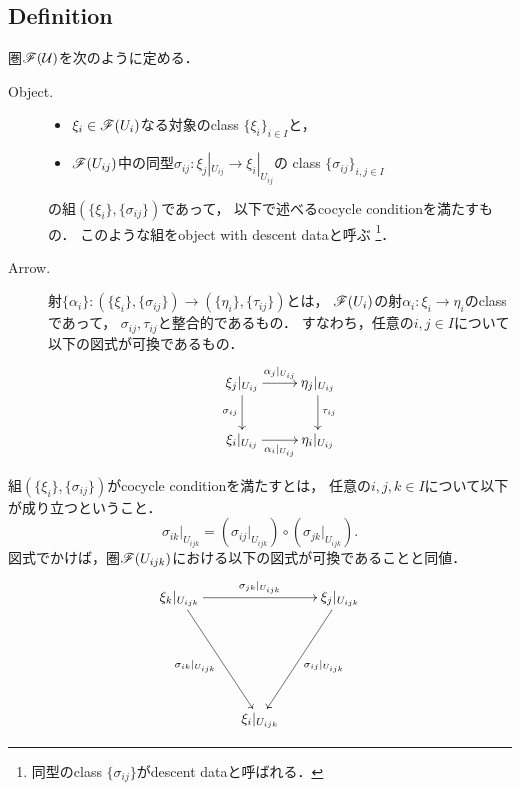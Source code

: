 \documentclass[a4paper]{jsarticle}
\begin{document}
\subsection{Definition}
\begin{Def}
    圏$\mathscr{F}(\mathcal{U})$を次のように定める．
    \begin{description}
        \item[Object.] \hfill \vspace{-0.2cm}
            \begin{itemize}
                \item $\xi_i \in \mathscr{F}(U_i)$なる対象のclass $\{\xi_i\}_{i \in I}$と，
                \item
                    $\mathscr{F}(U_{ij})$中の同型$\sigma_{ij} \colon \xi_j|_{U_{ij}} \to \xi_i|_{U_{ij}}$の
                    class $\{\sigma_{ij}\}_{i,j \in I}$
            \end{itemize}
            の組$(\{\xi_i\}, \{\sigma_{ij}\})$であって，
            以下で述べるcocycle conditionを満たすもの．
            このような組をobject with descent dataと呼ぶ
            \footnote{ 同型のclass $\{\sigma_{ij}\}$がdescent dataと呼ばれる． }．

        \item[Arrow.] \mnewline
            射$\{\alpha_i\} \colon (\{\xi_i\}, \{\sigma_{ij}\}) \to (\{\eta_i\}, \{\tau_{ij}\})$とは，
            $\mathscr{F}(U_i)$の射$\alpha_i \colon \xi_i \to \eta_i$のclassであって，\mnewline
            $\sigma_{ij}, \tau_{ij}$と整合的であるもの．
            すなわち，任意の$i, j \in I$について以下の図式が可換であるもの．
            \[\xymatrix{
                \ar[d]_-{\sigma_{ij}} \xi_j|_{U_{ij}} \ar[r]^-{\alpha_j|_{U_{ij}}}&
                \eta_j|_{U_{ij}} \ar[d]^-{\tau_{ij}}\\
                 \xi_i|_{U_{ij}} \ar[r]_-{\alpha_i|_{U_{ij}}}& \eta_i|_{U_{ij}}
            }\]
    \end{description}

    組$(\{\xi_i\}, \{\sigma_{ij}\})$がcocycle conditionを満たすとは，
    任意の$i,j,k \in I$について以下が成り立つということ．
    \[ \sigma_{ik}|_{U_{ijk}}=(\sigma_{ij}|_{U_{ijk}}) \circ (\sigma_{jk}|_{U_{ijk}}). \]
    図式でかけば，圏$\mathscr{F}(U_{ijk})$における以下の図式が可換であることと同値．
    \[\xymatrix@R=70pt{
         \xi_k|_{U_{ijk}} \ar[rd]_-{\sigma_{ik}|_{U_{ijk}}} \ar[rr]^-{\sigma_{jk}|_{U_{ijk}}}
            & {}
            & \xi_j|_{U_{ijk}} \ar[ld]^-{\sigma_{ij}|_{U_{ijk}}} \\
        {} & \xi_i|_{U_{ijk}} & {}
    }\]
\end{Def}
\end{document}
